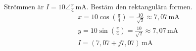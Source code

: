\begin{exempel}
Strömmen är $I = 10\angle\frac{\pi}{4}\,\text{mA}$. Bestäm den rektangulära formen.
\begin{gather*}
  x = 10\cos\left(\frac{\pi}{4}\right) = \frac{10}{\sqrt{2}} \approx 7{,}07\,\text{mA} \\
  y = 10\sin\left(\frac{\pi}{4}\right) = \frac{10}{\sqrt{2}} \approx 7{,}07\,\text{mA} \\
  I = (7{,}07 + j7{,}07)\,\text{mA}
\end{gather*}
\end{exempel}
